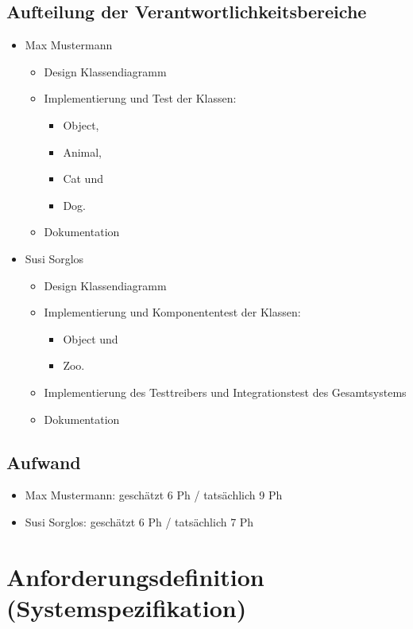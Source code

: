 \documentclass[12pt,naustrian,a4widepaper]{scrartcl}
\begin{document}
\subsection{Aufteilung der Verantwortlichkeitsbereiche}
\begin{itemize}
	\item Max Mustermann
		\begin{itemize}
			\item Design Klassendiagramm
			\item Implementierung und Test der Klassen: 
			\begin{itemize}
				\item Object,
				\item Animal, 
				\item Cat und
				\item Dog.
			\end{itemize}
			\item Dokumentation
		\end{itemize}
	\item Susi Sorglos
		\begin{itemize}
			\item Design Klassendiagramm
			\item Implementierung und Komponententest der Klassen: 
			\begin{itemize}
				\item Object und
				\item Zoo. 
			\end{itemize}
			\item Implementierung des Testtreibers und Integrationstest des Gesamtsystems
			\item Dokumentation
		\end{itemize}	
\end{itemize}

\subsection{Aufwand}
	
	\begin{itemize}
		\item Max Mustermann: geschätzt 6 Ph / tatsächlich 9 Ph
		\item Susi Sorglos: geschätzt 6 Ph / tatsächlich 7 Ph
	\end{itemize}

\clearpage
\section{Anforderungsdefinition (Systemspezifikation)}
\end{document}
